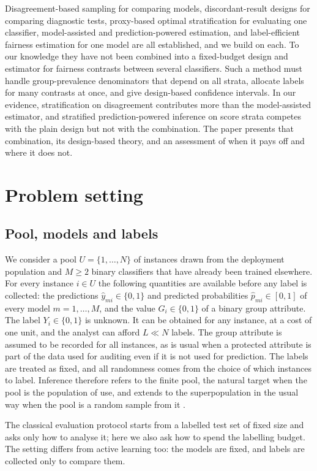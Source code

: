 \documentclass[pdflatex,sn-mathphys-num,iicol]{sn-jnl}
\theoremstyle{thmstyleone}
\theoremstyle{thmstyletwo}
\theoremstyle{thmstylethree}
\begin{document}
Disagreement-based sampling for comparing models, discordant-result designs for comparing diagnostic tests, proxy-based optimal stratification for evaluating one classifier, model-assisted and prediction-powered estimation, and label-efficient fairness estimation for one model are all established, and we build on each. To our knowledge they have not been combined into a fixed-budget design and estimator for fairness contrasts between several classifiers. Such a method must handle group-prevalence denominators that depend on all strata, allocate labels for many contrasts at once, and give design-based confidence intervals. In our evidence, stratification on disagreement contributes more than the model-assisted estimator, and stratified prediction-powered inference on score strata competes with the plain design but not with the combination. The paper presents that combination, its design-based theory, and an assessment of when it pays off and where it does not.

\section{Problem setting}\label{sec:setting}

\subsection{Pool, models and labels}
We consider a pool $U=\{1,\dots,N\}$ of instances drawn from the deployment population and $M\ge 2$ binary classifiers that have already been trained elsewhere. For every instance $i\in U$ the following quantities are available before any label is collected: the predictions $\hat y_{mi}\in\{0,1\}$ and predicted probabilities $\hat p_{mi}\in[0,1]$ of every model $m=1,\dots,M$, and the value $G_i\in\{0,1\}$ of a binary group attribute. The label $Y_i\in\{0,1\}$ is unknown. It can be obtained for any instance, at a cost of one unit, and the analyst can afford $L\ll N$ labels. The group attribute is assumed to be recorded for all instances, as is usual when a protected attribute is part of the data used for auditing even if it is not used for prediction. The labels are treated as fixed, and all randomness comes from the choice of which instances to label. Inference therefore refers to the finite pool, the natural target when the pool is the population of use, and extends to the superpopulation in the usual way when the pool is a random sample from it \citep{sarndal1992}.

The classical evaluation protocol starts from a labelled test set of fixed size and asks only how to analyse it; here we also ask how to spend the labelling budget. The setting differs from active learning too: the models are fixed, and labels are collected only to compare them.
\end{document}
